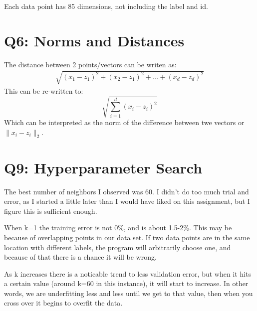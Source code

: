 \documentclass{article}
\begin{document}
        Each data point has 85 dimensions, not including the label and id.
    \section*{Q6: Norms and Distances}
        The distance between 2 points/vectors can be writen as:
        \begin{align*}
            \sqrt{(x_1-z_1)^2 + (x_2- z_1)^2 + ... + (x_d-z_d)^2}
        \end{align*}
        This can be re-written to:
        \begin{equation*}
            \sqrt{\sum_{i=1}^d (x_i-z_i)^2}
        \end{equation*}
        Which can be interpreted as the norm of the difference between twe vectors or $\lVert x_i - z_i \rVert _2$.

    \section*{Q9: Hyperparameter Search}

        The best number of neighbors I observed was 60. I didn't do too much trial and error, as I started a little later than I would have liked on this assignment, but I figure this is sufficient enough.
        
        When k=1 the training error is not 0\%, and is about 1.5-2\%. This may be because of overlapping points in our data set. If two data points are in the same location with different labels, the program will arbitrarily choose one, and because of that there is a chance it will be wrong.

        As k increases there is a noticable trend to less validation error, but when it hits a certain value (around k=60 in this instance), it will start to increase. In other words, we are underfitting less and less until we get to that value, then when you cross over it begins to overfit the data.
\end{document}
